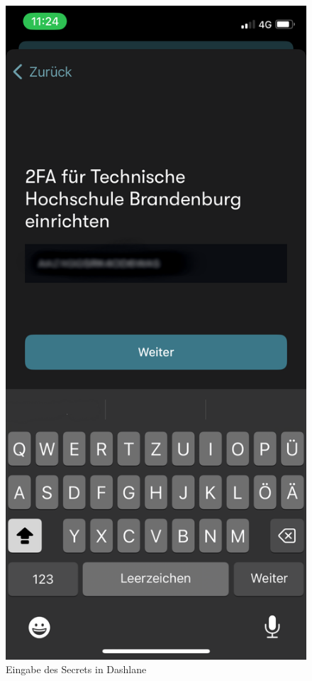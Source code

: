 \documentclass{article}
\begin{document}
\begin{figure}[H]
	\includegraphics[height=0.25\textheight]{./images/05-eingabe-secret.png}
	\centering
	\caption{Eingabe des Secrets in Dashlane}
\end{figure}
\end{document}
